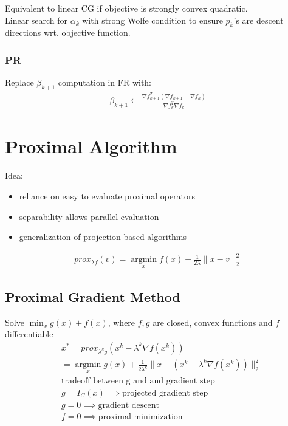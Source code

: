 \documentclass[8pt,letter]{article}
\DeclareMathOperator*{\argmin}{argmin}
\newcommand*{\argminl}{\argmin\limits}
\begin{document}
\begin{multicols*}{2}
  Equivalent to linear CG if objective is strongly convex quadratic.\\

  Linear search for $\alpha_k$ with strong Wolfe condition to ensure $p_k$'s are descent directions wrt. objective function.\\
  
  \subsubsection{PR}
  Replace $\beta_{k+1}$ computation in FR with:
  \begin{align*}
    \beta_{k+1} \leftarrow \frac{\nabla f_{k+1}^T (\nabla f_{k+1} - \nabla f_k)}{\nabla f_k^T \nabla f_k}
  \end{align*}
  
  \vfill\null
  \columnbreak
  
  \section{Proximal Algorithm}
  Idea:
  \begin{itemize}
  \item reliance on easy to evaluate proximal operators
  \item separability allows parallel evaluation
  \item generalization of projection based algorithms
  \end{itemize}

  \begin{align*}
    prox_{\lambda f}(v) = \argminl_{x} f(x) + \frac{1}{2 \lambda} \|x-v\|_2^2
  \end{align*}

  \subsection{Proximal Gradient Method}  
  Solve $\min_{x} g(x)+f(x)$, where $f,g$ are closed, convex functions and $f$ differentiable
  \begin{align*}
    &x^* = prox_{\lambda^k g}(x^k-\lambda^k \nabla f(x^k)) \\
    &=\argminl_{x} g(x) + \frac{1}{2 \lambda^k} \|x - (x^k - \lambda^k \nabla f(x^k))\|_2^2\\
    &\text{tradeoff between g and and gradient step}\\
    &g=I_C(x) \implies \text{projected gradient step}\\
    &g=0 \implies \text{gradient descent}\\
    &f=0 \implies \text{proximal minimization}
  \end{align*}


\end{multicols*}
\end{document}
